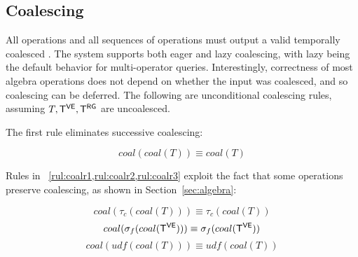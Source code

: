 \subsection{Coalescing}
\label{sec:sys:coal}


All operations and all sequences of operations must output a valid
temporally coalesced \tg.  The \ql system supports both eager and lazy
coalescing, with lazy being the default behavior for multi-operator
queries.  Interestingly, correctness of most \tg algebra operations
does not depend on whether the input was coalesced, and so coalescing
can be deferred.  The following are unconditional coalescing rules,
assuming $T, \mathsf{T^{VE}}, \mathsf{T^{RG}}$ are uncoalesced.

The first rule eliminates successive coalescing:

\begin{equation}
coal(coal(T)) \equiv coal(T)
\label{rul:coalr0}
\end{equation}

Rules in ~\cref{rul:coalr1,rul:coalr2,rul:coalr3} exploit the
fact that some operations preserve coalescing, as shown in
Section~\ref{sec:algebra}:

\begin{equation}
coal(\tau_c(coal(T))) \equiv \tau_c(coal(T))
\label{rul:coalr1}
\end{equation}
\begin{equation}
coal(\sigma_f(coal(\mathsf{T^{VE}}))) \equiv \sigma_f(coal(\mathsf{T^{VE}}))
\label{rul:coalr2}
\end{equation}
\begin{equation}
coal(udf(coal(T))) \equiv udf(coal(T))
\label{rul:coalr3}
\end{equation}


